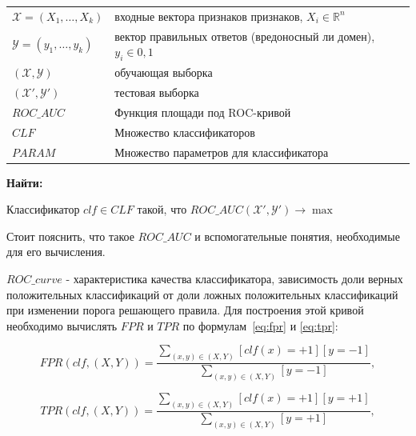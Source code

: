\documentclass[a4paper,14pt]{extreport} %
\begin{document}
\begin{tabular}{p{6cm} p{7.5cm}}
	$\mathcal{X}=(X_1,\ldots,X_k)$ & входные вектора признаков признаков, $X_i\in\mathbb{R}^n$                \\[0.1cm]
	$\mathcal{Y}=(y_1,\ldots,y_k)$ & вектор правильных ответов (вредоносный ли домен), $y_i\in{0,1}$ \\[0.1cm]
	$(\mathcal{X},\mathcal{Y})$    & обучающая выборка                                                                        \\[0.1cm]
	$(\mathcal{X'},\mathcal{Y'})$  & тестовая выборка                                                                          \\[0.1cm]
	$ROC\_AUC$                     & Функция площади под ROC-кривой                                                    \\[0.1cm]
	$CLF$                          & Множество классификаторов                                                        \\[0.1cm]
	$PARAM$                        & Множество параметров для классификатора                              \\[0.1cm]
			
\end{tabular}
	 
{\bf
	Найти:
} 

Классификатор $clf \in CLF$ такой, что $ROC\_AUC(\mathcal{X'},\mathcal{Y'}) \rightarrow \max$ 
\newline
	
Стоит пояснить, что такое $ROC\_AUC$ и вспомогательные понятия, необходимые для его вычисления. 
	
$ROC\_curve$ - характеристика качества классификатора, зависимость доли верных положительных классификаций от доли ложных положительных классификаций при изменении порога решающего правила. Для построения этой кривой необходимо вычислять $FPR$ и $TPR$ по формулам~\eqref{eq:fpr} и \eqref{eq:tpr}:
	
\begin{equation}
	\label{eq:fpr}
	FPR(clf, (X, Y)) = \frac{\sum_{(x, y) \in (X, Y)}[clf(x)=+1][y=-1]}{\sum_{(x, y) \in (X, Y)}[y=-1]},
\end{equation}
	
\begin{equation}
	\label{eq:tpr}
	TPR(clf, (X, Y)) = \frac{\sum_{(x, y) \in (X, Y)}[clf(x)=+1][y=+1]}{\sum_{(x, y) \in (X, Y)}[y=+1]},
\end{equation}
	
\end{document}
